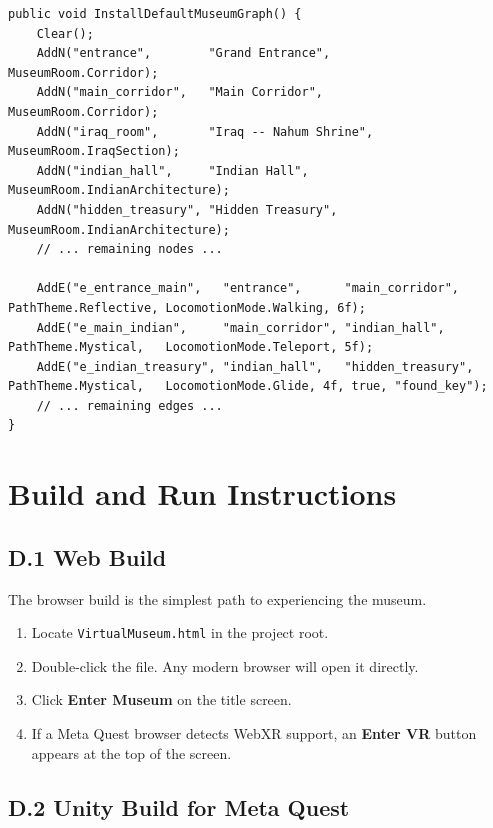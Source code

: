 \begin{lstlisting}[language={[Sharp]C}]
public void InstallDefaultMuseumGraph() {
    Clear();
    AddN("entrance",        "Grand Entrance",       MuseumRoom.Corridor);
    AddN("main_corridor",   "Main Corridor",        MuseumRoom.Corridor);
    AddN("iraq_room",       "Iraq -- Nahum Shrine", MuseumRoom.IraqSection);
    AddN("indian_hall",     "Indian Hall",          MuseumRoom.IndianArchitecture);
    AddN("hidden_treasury", "Hidden Treasury",      MuseumRoom.IndianArchitecture);
    // ... remaining nodes ...

    AddE("e_entrance_main",   "entrance",      "main_corridor",   PathTheme.Reflective, LocomotionMode.Walking, 6f);
    AddE("e_main_indian",     "main_corridor", "indian_hall",     PathTheme.Mystical,   LocomotionMode.Teleport, 5f);
    AddE("e_indian_treasury", "indian_hall",   "hidden_treasury", PathTheme.Mystical,   LocomotionMode.Glide, 4f, true, "found_key");
    // ... remaining edges ...
}
\end{lstlisting}

\chapter{Build and Run Instructions}

\section*{D.1 Web Build}

The browser build is the simplest path to experiencing the museum.

\begin{enumerate}
\item Locate \texttt{VirtualMuseum.html} in the project root.
\item Double-click the file. Any modern browser will open it directly.
\item Click \textbf{Enter Museum} on the title screen.
\item If a Meta Quest browser detects WebXR support, an \textbf{Enter VR} button appears at the top of the screen.
\end{enumerate}

\section*{D.2 Unity Build for Meta Quest}

